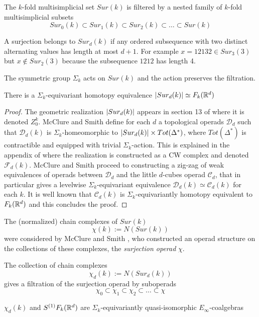 The $k$-fold multisimplicial set $Sur(k)$ is filtered
by a nested family of $k$-fold multisimplicial subsets
$$Sur_0(k) \subset Sur_1(k) \subset Sur_2(k)  \subset \dots \subset Sur(k)$$

A surjection belongs to $Sur_d(k)$
if any ordered subsequence with two distinct alternating values has length at most $d+1$.
For example $x=12132 \in Sur_3(3)$ but $x \notin Sur_2(3)$ because the subsequence $1212$ has length 4.

The symmetric group $\Sigma_k$ acts on $Sur(k)$ and the action preserves the filtration.

\begin{proposition} \label{sur-real}
	There is a $\Sigma_k$-equivariant homotopy equivalence
	$\lvert Sur_d(k)\rvert \simeq F_k(\mathbb{R}^d)$
\end{proposition}

\begin{proof}
	The geometric realization $\lvert Sur_d(k)\rvert$ appears in section 13 of \cite{MS} where it is denoted $Z_0^k$.
	McClure and Smith define for each $d$ a topological operads $\mathcal{D}_d$ such that $\mathcal{D}_d(k)$ is $\Sigma_k$-homeomorphic to $\lvert Sur_d(k)\rvert \times Tot(\Delta^*)$, where $Tot(\Delta^*)$ is  contractible and equipped with trivial $\Sigma_k$-action.
	This is explained in the appendix of \cite{cyclic} where the realization is constructed as a CW complex and denoted $\mathcal{F}_d(k)$.
	McClure and Smith proceed to constructing a zig-zag of weak equivalences of operads between $\mathcal{D}_d$ and the little $d$-cubes operad
	$\mathcal{C}_d$, that in particular gives a levelwise $\Sigma_k$-equivariant equivalence $\mathcal{D}_d(k) \simeq \mathcal{C}_d(k)$ for each $k$. It is well known that $\mathcal{C}_d(k)$ is $\Sigma_k$-equivariantly homotopy equivalent to $F_k(\mathbb{R}^d)$ and this concludes the proof.
\end{proof}

The (normalized) chain complexes
of $Sur(k)$  $$\chi(k):=N(Sur(k))$$
were considered by McClure and Smith
\cite{MS}, %
who constructed an operad structure
on the collections of these complexes, the {\it surjection operad} $\chi$.

The collection of chain complexes
$$\chi_d(k):=N(Sur_d(k))$$
gives a filtration of the surjection operad by suboperads
$$\chi_0 \subset \chi_1 \subset \chi_2 \subset  \dots \subset \chi$$

\begin{proposition}\label{sur-model}
	$\chi_d(k)$ and $S^{(1)}{F_k(\mathbb{R}^d)}$ are $\Sigma_k$-equivariantly quasi-isomorphic $E_\infty$-coalgebras
\end{proposition}

